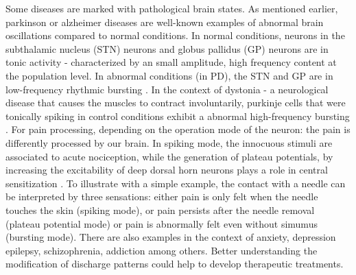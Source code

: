 Some diseases are marked with pathological brain states. As mentioned earlier, parkinson or alzheimer diseases are well-known examples of abnormal brain oscillations compared to normal conditions. In normal conditions, neurons in the subthalamic nucleus (STN) neurons and globus pallidus (GP) neurons are in tonic activity - characterized by an small amplitude, high frequency content at the population level. In abnormal conditions (in PD), the STN and GP are in low-frequency rhythmic bursting \citep{bevan_move_2002, beurrier_subthalamic_1999}. In the context of dystonia - a neurological disease that causes the muscles to contract involuntarily, purkinje cells that were tonically spiking in control conditions exhibit a abnormal high-frequency bursting \citep{fremont_abnormal_2014}. For pain processing, depending on the operation mode of the neuron: the pain is differently processed by our brain. In spiking mode, the innocuous stimuli are associated to acute nociception, while the generation of plateau potentials, by increasing the excitability of deep dorsal horn neurons plays a role in central sensitization \citep{marder_plateau_2003}. To illustrate with a simple example, the contact with a needle can be interpreted by three sensations: either pain is only felt when the needle touches the skin (spiking mode), or pain persists after the needle removal (plateau potential mode) or pain is abnormally felt even without simumus (bursting mode). There are also examples in the context of anxiety, depression epilepsy, schizophrenia, addiction among others. Better understanding the modification of discharge patterns could help to develop therapeutic treatments. 



